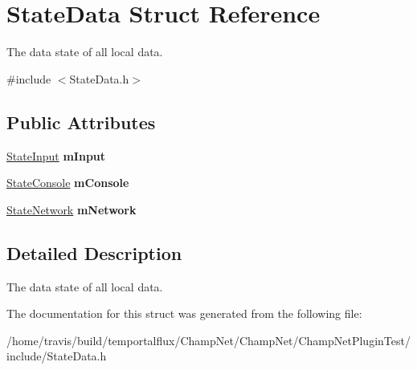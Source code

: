 \hypertarget{struct_state_data}{\section{State\-Data Struct Reference}
\label{struct_state_data}
}


The data state of all local data.  




{\ttfamily \#include $<$State\-Data.\-h$>$}

\subsection*{Public Attributes}
\begin{DoxyCompactItemize}
\item 
\hypertarget{struct_state_data_a0535bc84710174d9fc4051979e2d631b}{\hyperlink{struct_state_input}{State\-Input} {\bfseries m\-Input}}\label{struct_state_data_a0535bc84710174d9fc4051979e2d631b}

\item 
\hypertarget{struct_state_data_a55d003000ef9ac2290f9aff3c2e4437d}{\hyperlink{struct_state_console}{State\-Console} {\bfseries m\-Console}}\label{struct_state_data_a55d003000ef9ac2290f9aff3c2e4437d}

\item 
\hypertarget{struct_state_data_a0490590a43df414f8d751f50afbe926f}{\hyperlink{struct_state_network}{State\-Network} {\bfseries m\-Network}}\label{struct_state_data_a0490590a43df414f8d751f50afbe926f}

\end{DoxyCompactItemize}


\subsection{Detailed Description}
The data state of all local data. 

The documentation for this struct was generated from the following file\-:\begin{DoxyCompactItemize}
\item 
/home/travis/build/temportalflux/\-Champ\-Net/\-Champ\-Net/\-Champ\-Net\-Plugin\-Test/include/State\-Data.\-h\end{DoxyCompactItemize}
